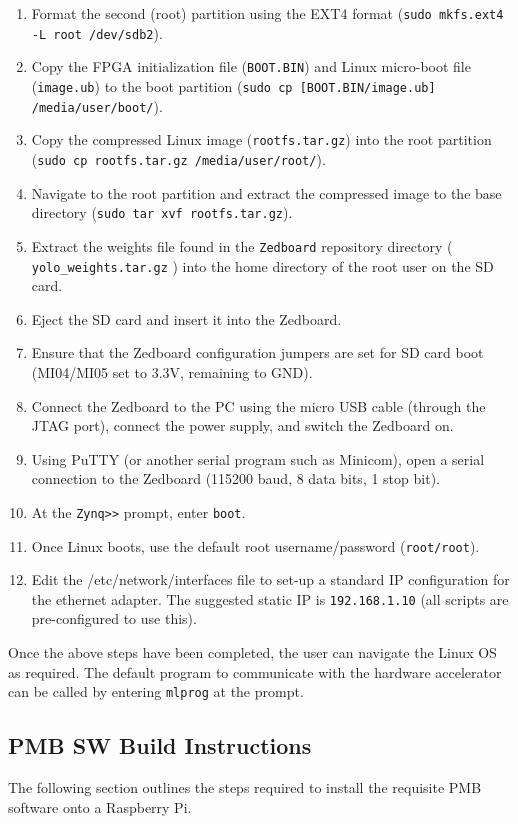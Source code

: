 \documentclass[10pt,letterpaper]{article}
\begin{document}
\begin{enumerate}
\item Format the second (root) partition using the EXT4 format (\texttt{sudo mkfs.ext4 -L root /dev/sdb2}).
\item Copy the FPGA initialization file (\texttt{BOOT.BIN}) and Linux micro-boot file (\texttt{image.ub}) to the boot partition (\texttt{sudo cp [BOOT.BIN/image.ub] /media/user/boot/}).
\item Copy the compressed Linux image (\texttt{rootfs.tar.gz}) into the root partition (\texttt{sudo cp rootfs.tar.gz /media/user/root/}). 
\item Navigate to the root partition and extract the compressed image to the base directory (\texttt{sudo tar xvf rootfs.tar.gz}).
\item Extract the weights file found in the \texttt{Zedboard\/} repository directory ( \texttt{yolo\_weights.tar.gz} ) into the home directory of the root user on the SD card.
\item Eject the SD card and insert it into the Zedboard.
\item Ensure that the Zedboard configuration jumpers are set for SD card boot (MI04/MI05 set to 3.3V, remaining to GND).
\item Connect the Zedboard to the PC using the micro USB cable (through the JTAG port), connect the power supply, and switch the Zedboard on.
\item Using PuTTY (or another serial program such as Minicom), open a serial connection to the Zedboard (115200 baud, 8 data bits, 1 stop bit).
\item At the \texttt{Zynq>>} prompt, enter \texttt{boot}.
\item Once Linux boots, use the default root username/password (\texttt{root/root}).
\item Edit the /etc/network/interfaces file to set-up a standard IP configuration for the ethernet adapter. The suggested static IP is \texttt{192.168.1.10} (all scripts are pre-configured to use this).
\end{enumerate}

Once the above steps have been completed, the user can navigate the Linux OS as required. The default program to communicate with the hardware accelerator can be called by entering \texttt{mlprog} at the prompt.

\subsection{PMB SW Build Instructions}
The following section outlines the steps required to install the requisite PMB software onto a Raspberry Pi.
\end{document}
